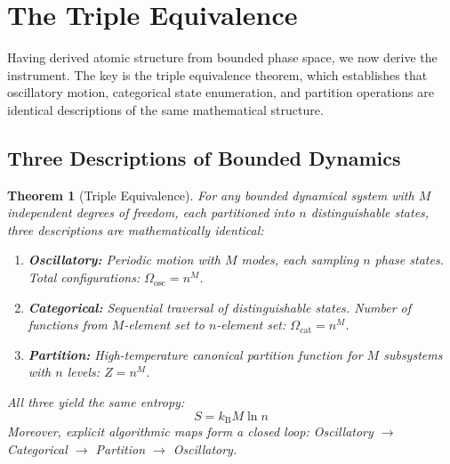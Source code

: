 \documentclass[11pt,a4paper]{article}
\newtheorem{theorem}{Theorem}[section]
\theoremstyle{definition}
\theoremstyle{remark}
\newcommand{\kB}{k_{\mathrm{B}}}
\begin{document}
\section{The Triple Equivalence}
\label{sec:triple_equivalence}

Having derived atomic structure from bounded phase space, we now derive the instrument. The key is the triple equivalence theorem, which establishes that oscillatory motion, categorical state enumeration, and partition operations are identical descriptions of the same mathematical structure.

\subsection{Three Descriptions of Bounded Dynamics}

\begin{theorem}[Triple Equivalence]
\label{thm:triple}
For any bounded dynamical system with $M$ independent degrees of freedom, each partitioned into $n$ distinguishable states, three descriptions are mathematically identical:
\begin{enumerate}
\item \textbf{Oscillatory:} Periodic motion with $M$ modes, each sampling $n$ phase states. Total configurations: $\Omega_{\mathrm{osc}} = n^M$.
\item \textbf{Categorical:} Sequential traversal of distinguishable states. Number of functions from $M$-element set to $n$-element set: $\Omega_{\mathrm{cat}} = n^M$.
\item \textbf{Partition:} High-temperature canonical partition function for $M$ subsystems with $n$ levels: $Z = n^M$.
\end{enumerate}
All three yield the same entropy:
\begin{equation}
S = \kB M \ln n
\label{eq:triple_entropy}
\end{equation}
Moreover, explicit algorithmic maps form a closed loop: Oscillatory $\to$ Categorical $\to$ Partition $\to$ Oscillatory.
\end{theorem}
\end{document}
